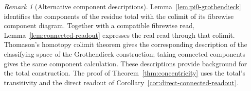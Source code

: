 \documentclass[11pt]{article}
\theoremstyle{plain}
\theoremstyle{definition}
\theoremstyle{remark}
\newtheorem{remark}[theorem]{Remark}
\begin{document}
\begin{remark}[Alternative component descriptions]\label{rmk:thomason}
Lemma~\ref{lem:pi0-grothendieck} identifies the components of the residue
total with the colimit of its fibrewise component diagram. Together with
a compatible fibrewise read, Lemma~\ref{lem:connected-readout} expresses
the real read through that colimit. Thomason's homotopy colimit theorem
\cite{Thomason79} gives the corresponding description of the classifying
space of the Grothendieck construction; taking connected components gives
the same component calculation. These descriptions provide background
for the total construction. The proof of
Theorem~\ref{thm:concentricity} uses the total's transitivity and the
direct readout of Corollary~\ref{cor:direct-connected-readout}.
\end{remark}
\end{document}
